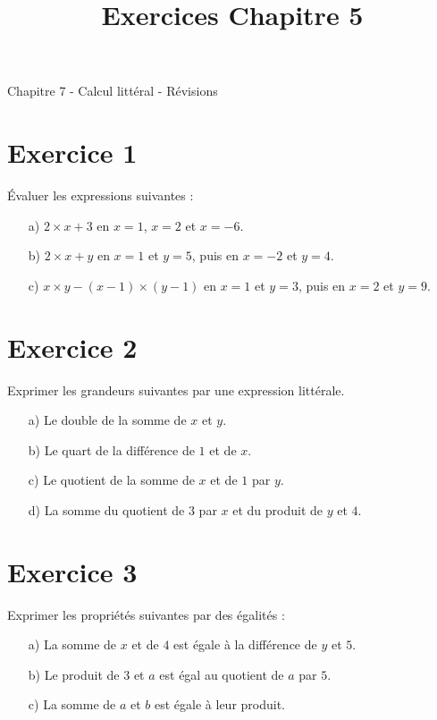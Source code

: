 \documentclass[12 pt]{article}
\title{Exercices Chapitre 5}
\date{}
\theoremstyle{plain}
\newcounter{n}
\numberwithin{n}{section}
\begin{document}
\begin{center}{\Large Chapitre 7 - Calcul littéral - Révisions}\\ 
 \end{center}

\section{Exercice 1}

Évaluer les expressions suivantes : \begin{itemize}
\item[a) ]  $2\times x +3$ en $x=1$, $x=2$ et $x=-6$.   
\item[b) ]  $2\times x +y$ en $x=1$ et $y=5$, puis en $x=-2$ et $y=4$.   
\item[c) ]  $x \times y - (x-1) \times (y-1) $ en $x=1$ et $y=3$, puis en $x=2$ et $y=9$. 
\end{itemize}
\section{Exercice 2}

Exprimer les grandeurs suivantes par une expression littérale. 

\begin{itemize}
\item[a) ] Le double de la somme de $x$ et $y$.
\item[b) ] Le quart de la différence de $1$ et de $x$. 
\item[c) ] Le quotient de la somme de $x$ et de $1$ par $y$. 
\item[d) ] La somme du quotient de $3$ par $x$ et du produit de $y$ et $4$.
\end{itemize}

\section{Exercice 3}

Exprimer les propriétés suivantes par des égalités :

\begin{itemize}
\item[a) ] La somme de $x$ et de $4$ est égale à la différence de $y$ et $5$. 
\item[b)] Le produit de $3$ et $a$ est égal au quotient de $a$ par $5$. 
\item[c)] La somme de $a$ et $b$ est égale à leur produit. 
\end{itemize}
\end{document}
